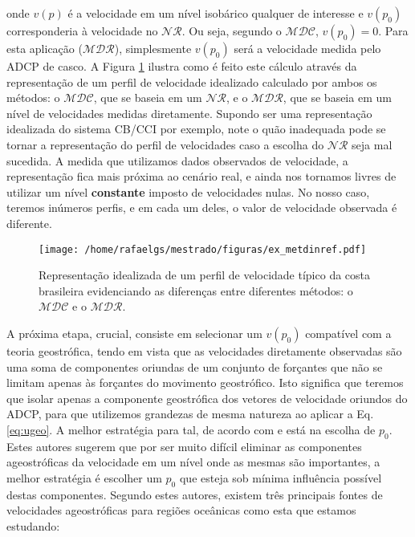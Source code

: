 \documentclass[12pt,portuguese,a4paper,pdftex]{article}
\renewcommand{\baselinestretch}{1.5}
\begin{document}
onde $v(p)$ é a velocidade em um nível isobárico qualquer de interesse e $v(p_0)$ corresponderia à 
velocidade no $\mathcal{NR}$. Ou seja, segundo o $\mathcal{MDC}$, $v(p_0) = 0$. Para esta aplicação ($\mathcal{MDR}$), simplesmente
$v(p_0)$ será a velocidade medida pelo ADCP de casco. A Figura \ref{fig:ex_metdinref} ilustra como é feito este cálculo
através da representação de um perfil de velocidade idealizado calculado por ambos os métodos: o $\mathcal{MDC}$, 
que se baseia em um $\mathcal{NR}$, e o $\mathcal{MDR}$, que se baseia em um nível de 
velocidades medidas diretamente. Supondo ser uma representação idealizada do sistema CB/CCI por exemplo, note
o quão inadequada pode se tornar a representação do perfil de velocidades caso a escolha do $\mathcal{NR}$ seja mal sucedida. 
A medida que utilizamos dados observados de velocidade, a representação fica mais próxima ao cenário real, e ainda nos
tornamos livres de utilizar um nível {\bf constante} imposto de velocidades nulas. No nosso caso, teremos inúmeros perfis, 
e em cada um deles, o valor de velocidade observada é diferente.

\begin{figure}%
 \begin{center}
  \texttt{[image: /home/rafaelgs/mestrado/figuras/ex\_metdinref.pdf]}
 \end{center}
 \vspace{-.25cm}
 \renewcommand{\baselinestretch}{1}
 \caption{\label{fig:ex_metdinref} \small Representação idealizada de um perfil de velocidade típico da 
costa brasileira evidenciando as diferenças entre diferentes métodos: o $\mathcal{MDC}$ e o 
$\mathcal{MDR}$.}
\end{figure}

A próxima etapa, crucial, consiste em selecionar um $v(p_0)$ compatível com a teoria geostrófica, tendo em vista
que as velocidades diretamente observadas são uma soma de componentes oriundas de um conjunto de forçantes que 
não se limitam apenas às forçantes do movimento geostrófico. Isto significa que teremos que isolar apenas a 
componente geostrófica dos vetores de velocidade oriundos do ADCP, para que utilizemos grandezas de mesma natureza ao
aplicar a Eq. \ref{eq:ugeo}. A melhor estratégia para tal, de acordo com 
 \cite{pickard_lindstrom1993} e \cite{sutton_chereskin2002} está na escolha de $p_0$. Estes autores sugerem que 
por ser muito difícil eliminar as componentes ageostróficas da velocidade em um nível onde as mesmas são 
importantes, a melhor estratégia é escolher um $p_0$ que esteja sob mínima influência possível destas
componentes. Segundo estes autores, existem três principais fontes de 
velocidades ageostróficas para regiões oceânicas como esta que estamos estudando: 
\end{document}
